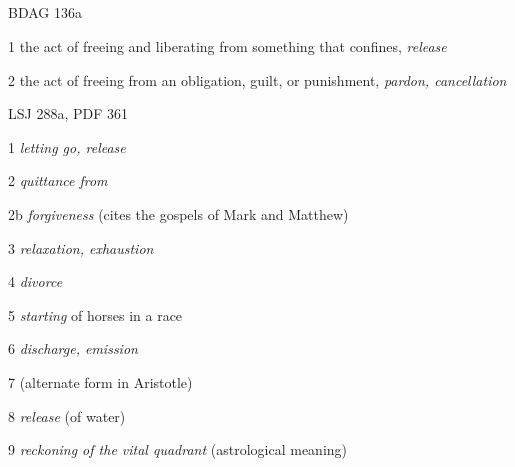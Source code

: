 			\subparagraph{\texorpdfstring{}{}}
				\label{APHESIS}
			
				\begin{compactdesc}
					\item[BDAG 136a] \textbf{}
						\begin{compactitem}
							\item[1] the act of freeing and liberating from something that confines, \textit{release}
							\item[2] the act of freeing from an obligation, guilt, or punishment, \textit{pardon, cancellation}
						\end{compactitem}
					\item[LSJ 288a, PDF 361] \textbf{}
						\begin{compactitem}
							\item[1] \textit{letting go, release}
							\item[2] \textit{quittance from}
							\item[2b] \textit{forgiveness} (cites the gospels of Mark and Matthew)
							\item[3] \textit{relaxation, exhaustion}
							\item[4] \textit{divorce}
							\item[5] \textit{starting} of horses in a race
							\item[6] \textit{discharge, emission}
							\item[7] (alternate form in Aristotle)
							\item[8] \textit{release} (of water)
							\item[9] \textit{reckoning of the vital quadrant} (astrological meaning)
						\end{compactitem}
				\end{compactdesc}
				

